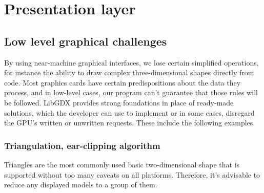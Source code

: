 \chapter{Presentation layer}

\section{Low level graphical challenges}

By using near-machine graphical interfaces, we lose certain simplified operations, for instance the ability to draw complex three-dimensional shapes directly from code. Most graphics cards have certain predispositions about the data they process, and in low-level cases, our program can't guarantee that those rules will be followed. LibGDX provides strong foundations in place of ready-made solutions, which the developer can use to implement or in some cases, disregard the GPU's written or unwritten requests. These include the following examples.

\subsection{Triangulation, ear-clipping algorithm}

Triangles are the most commonly used basic two-dimensional shape that is supported without too many caveats on all platforms. Therefore, it's advisable to reduce any displayed models to a group of them.


